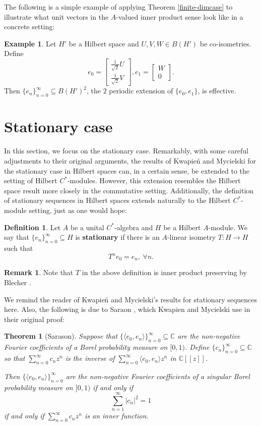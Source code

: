\documentclass[11pt]{amsart}
\newtheorem*{thm*}{Theorem}
\theoremstyle{definition}
\newtheorem{defn}[thm]{Definition}
\newtheorem{ex}[thm]{Example}
\newtheorem{rem}[thm]{Remark}
\numberwithin{equation}{section}
\begin{document}
The following is a simple example of applying Theorem \ref{finite-dimcase} to illustrate what unit vectors in the $A$-valued inner product sense look like in a concrete setting:

\begin{ex}
Let $H'$ be a Hilbert space and $U,V,W\in B(H')$ be co-isometries. Define $$e_{0}=\begin{bmatrix} \frac{1}{\sqrt{2}}U \\ \frac{1}{\sqrt{2}}V\end{bmatrix}, e_{1}=\begin{bmatrix} W \\ 0 \end{bmatrix}.$$ Then $\{e_{n}\}_{n=0}^{\infty}\subseteq B(H')^{2}$, the $2$ periodic extension of $\{e_{0},e_{1}\}$, is effective.
\end{ex}

\section{Stationary case}\label{S4}
In this section, we focus on the stationary case. Remarkably, with some careful adjustments to their original arguments, the results of Kwapień and Mycielski for the stationary case in Hilbert spaces can, in a certain sense, be extended to the setting of Hilbert $C^{*}$-modules. However, this extension resembles the Hilbert space result more closely in the commutative setting. Additionally, the definition of stationary sequences in Hilbert spaces extends naturally to the Hilbert 
$C^{*}$-module setting, just as one would hope:

\begin{defn}
Let $A$ be a unital $C^{*}$-algebra and $H$ be a Hilbert $A$-module. We say that $\{e_{n}\}_{n=0}^{\infty}\subseteq H$ is \textbf{stationary} if there is an $A$-linear isometry $T:H\to H$ such that $$T^{n}e_{0}=e_{n}, \ \forall n.$$
\end{defn}

\begin{rem}  
Note that $T$ in the above definition is inner product preserving by Blecher \cite{Blecher1997New}.
\end{rem}

We remind the reader of Kwapień and Mycielski's results for stationary sequences here.
Also, the following is due to Saraon \cite{Sarason1994Sub-Hardy}, which Kwapien and Mycielski use in their original proof:
\begin{thm*}[Sarason]\label{sarasonthm}
Suppose that $\{\langle e_{0}, e_{n}\rangle\}_{n=0}^{\infty}\subseteq \mathbb{C}$ are the non-negative Fourier coefficients of a Borel probability measure on $[0,1)$. Define $\{c_{n}\}_{n=0}^{\infty}\subseteq \mathbb{C}$ so that $\sum_{n=0}^{\infty}c_{n}z^{n}$ is the inverse of $\sum_{n=0}^{\infty}\langle e_{0}, e_{n}\rangle z^{n}$ in $\mathbb{C}[[z]]$. 

Then $\{\langle e_{0}, e_{n}\rangle\}_{n=0}^{\infty}$ are the non-negative Fourier coefficients of a singular Borel probability measure on $[0,1)$ if and only if $$\sum_{n=1}^{\infty}|c_{n}|^{2}=1$$ if and only if
$\sum_{n=0}^{\infty}c_{n}z^{n}$ is an inner function.
\end{thm*}
\end{document}
